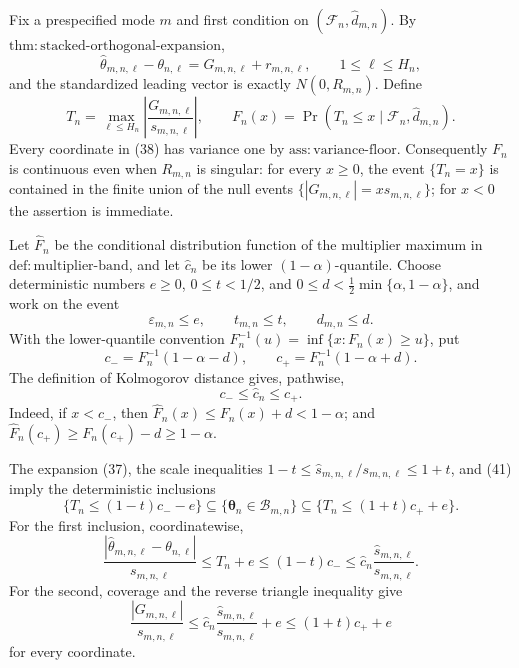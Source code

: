 Fix a prespecified mode \(m\) and first condition on \((\mathcal F_n,\widehat d_{m,n})\).  By \(\mathrm{thm{:}stacked\mbox{-}orthogonal\mbox{-}expansion}\),
\[
 \widehat\theta_{m,n,\ell}-\theta_{n,\ell}
 =G_{m,n,\ell}+r_{m,n,\ell},\qquad 1\le\ell\le H_n,
 \tag{37}
\]
and the standardized leading vector is exactly \(N(0,R_{m,n})\).  Define
\[
 T_n=\max_{\ell\le H_n}\left|\frac{G_{m,n,\ell}}{s_{m,n,\ell}}\right|,\qquad
 F_n(x)=\Pr(T_n\le x\mid\mathcal F_n,\widehat d_{m,n}).
 \tag{38}
\]
Every coordinate in (38) has variance one by \(\mathrm{ass{:}variance\mbox{-}floor}\).  Consequently \(F_n\) is continuous even when \(R_{m,n}\) is singular: for every \(x\ge0\), the event \(\{T_n=x\}\) is contained in the finite union of the null events
\(\{|G_{m,n,\ell}|=xs_{m,n,\ell}\}\); for \(x<0\) the assertion is immediate.

Let \(\widehat F_n\) be the conditional distribution function of the multiplier maximum in \(\mathrm{def{:}multiplier\mbox{-}band}\), and let \(\widehat c_n\) be its lower \((1-\alpha)\)-quantile.  Choose deterministic numbers \(e\ge0\), \(0\le t<1/2\), and
\(0\le d<\frac12\min\{\alpha,1-\alpha\}\), and work on the event
\[
 \varepsilon_{m,n}\le e,\qquad t_{m,n}\le t,\qquad d_{m,n}\le d.
 \tag{39}
\]
With the lower-quantile convention \(F_n^{-1}(u)=\inf\{x:F_n(x)\ge u\}\), put
\[
 c_-=F_n^{-1}(1-\alpha-d),\qquad
 c_+=F_n^{-1}(1-\alpha+d).
 \tag{40}
\]
The definition of Kolmogorov distance gives, pathwise,
\[
 c_-\le\widehat c_n\le c_+.
 \tag{41}
\]
Indeed, if \(x<c_-\), then \(\widehat F_n(x)\le F_n(x)+d<1-\alpha\); and
\(\widehat F_n(c_+)\ge F_n(c_+)-d\ge1-\alpha\).

The expansion (37), the scale inequalities
\(1-t\le\widehat s_{m,n,\ell}/s_{m,n,\ell}\le1+t\), and (41) imply the deterministic inclusions
\[
 \{T_n\le(1-t)c_- -e\}
 \subseteq\{\boldsymbol\theta_n\in\mathcal B_{m,n}\}
 \subseteq\{T_n\le(1+t)c_+ +e\}.
 \tag{42}
\]
For the first inclusion, coordinatewise,
\[
 \frac{|\widehat\theta_{m,n,\ell}-\theta_{n,\ell}|}{s_{m,n,\ell}}
 \le T_n+e\le(1-t)c_-
 \le\widehat c_n\frac{\widehat s_{m,n,\ell}}{s_{m,n,\ell}}.
\]
For the second, coverage and the reverse triangle inequality give
\[
 \frac{|G_{m,n,\ell}|}{s_{m,n,\ell}}
 \le\widehat c_n\frac{\widehat s_{m,n,\ell}}{s_{m,n,\ell}}+e
 \le(1+t)c_++e
\]
for every coordinate.


